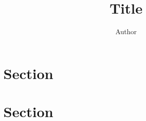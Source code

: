 \documentclass[11pt,compact,anonymous]{khabstract}
\title{Title}
\author{Author}
\begin{document}
\maketitle

\section{Section}
\lipsum[1-2]

\section{Section}
\lipsum[2-3]
\end{document}
